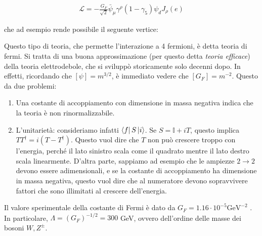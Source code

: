 \documentclass[11pt]{report}
\begin{document}
\begin{align}
    \mathcal{L} = -\frac{G_F}{\sqrt{2}}\bar{\psi}_\mu \gamma^\rho (1-\gamma_5)\psi_d J_\rho (e)
\end{align}

che ad esempio rende possibile il seguente vertice: 

\begin{center}
\end{center}

Questo tipo di teoria, che permette l'interazione a 4 fermioni, è detta teoria di fermi. Si tratta di una buona approssimazione (per questo detta \emph{teoria efficace}) della teoria elettrodebole, che si sviluppò storicamente solo decenni dopo. In effetti, ricordando che \([\psi] = m^{3/2}\), è immediato vedere che \([G_F] = m^{-2}\). Questo da due problemi: 

\begin{enumerate}
    \item Una costante di accoppiamento con dimensione in massa negativa indica che la teoria è non rinormalizzabile. 
    \item L'unitarietà: consideriamo infatti \(\bra{f}S\ket{i}\). Se \(S = \mathbb{I} + iT\), questo implica \(TT^\dagger = i(T-T^\dagger)\). Questo vuol dire che \(T\) non può crescere troppo con l'energia, perché il lato sinistro scala come il quadrato mentre il lato destro scala linearmente. D'altra parte, sappiamo ad esempio che le ampiezze \(2\to 2\) devono essere adimensionali, e se la costante di accoppiamento ha dimensione in massa negativa, questo vuol dire che al numeratore devono sopravvivere fattori che sono illimitati al crescere dell'energia. 
\end{enumerate}

Il valore sperimentale della costante di Fermi è dato da \(G_F = 1.16 \cdot 10^{-5} \text{GeV}^{-2}\) . In particolare, \(\Lambda = (G_F)^{-1/2} = 300\) GeV, ovvero dell'ordine delle masse dei bosoni \(W, Z^\pm\).  
\end{document}
